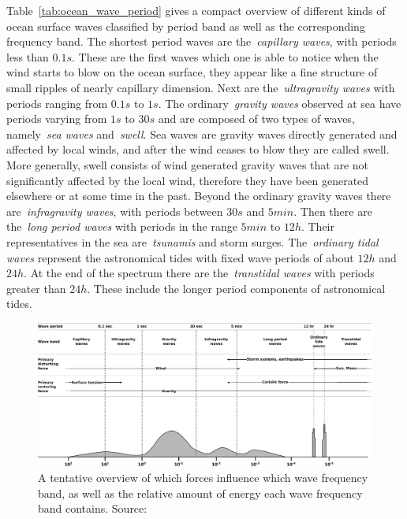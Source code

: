 Table~\ref{tab:ocean_wave_period} gives a compact overview of different kinds 
of ocean surface waves classified by period band as well as the corresponding 
frequency band. The shortest period waves are the~\emph{capillary waves}, with 
periods less than $0.1s$. These are the first waves which one is able to notice 
when the wind starts to blow on the ocean surface, they appear like a fine
structure of small ripples of nearly capillary dimension.
Next are the~\emph{ultragravity waves} with periods ranging from $0.1s$ to 
$1s$. The ordinary~\emph{gravity waves} observed at sea have periods varying 
from $1s$ to $30s$ and are composed of two types of waves, namely~\emph{sea 
waves} and~\emph{swell}.
Sea waves are gravity waves directly generated and affected by local winds,
and after the wind ceases to blow they are called swell.
More generally, swell
consists of wind generated gravity waves that are not significantly affected
by the local wind, therefore they have  been generated elsewhere or at some
time in the past.
Beyond the ordinary 
gravity waves there are~\emph{infragravity waves}, with periods between $30s$ 
and $5min$. Then there are the~\emph{long period waves} with periods in the 
range $5min$ to $12h$. Their representatives in the sea are~\emph{tsunamis} 
and storm surges. The~\emph{ordinary tidal waves} represent the astronomical 
tides with fixed wave periods of about $12h$ and $24h$. At the end of the 
spectrum there are the~\emph{transtidal waves} with periods greater than 
$24h$. These include the longer period components of astronomical tides.
%
\begin{figure}
  \centering
  \includegraphics[width=\textwidth]{figures/SurfaceWavesEnergy}
  \caption{A tentative overview of which forces influence which wave 
  frequency band, as well as the relative amount of energy
  each wave frequency band contains. Source: \citet{article:munkorigin}}
  \label{fig:surface_waves_energy}
\end{figure}
%

